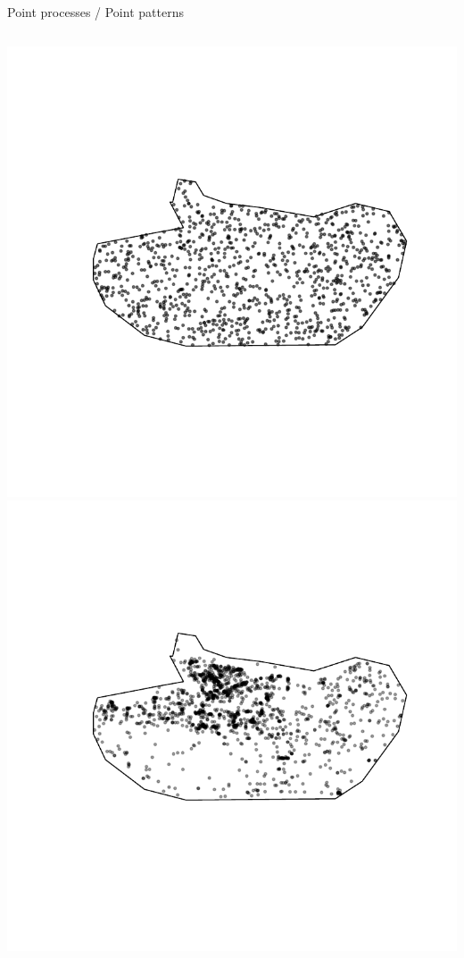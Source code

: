 \documentclass[serif]{beamer}
\begin{document}
\begin{frame}{Point processes / Point patterns}
\begin{itemize}
	\hspace*{-3cm}\begin{columns}
\hspace*{-.5cm}\column{5cm}		
\includegraphics[scale=.4]{poicrows.pdf}
\hspace*{-.5cm} \column{5cm}
\includegraphics[scale=.4]{crows.pdf}
\column{5cm}


\end{columns}
\end{itemize}
\end{frame}
\end{document}

